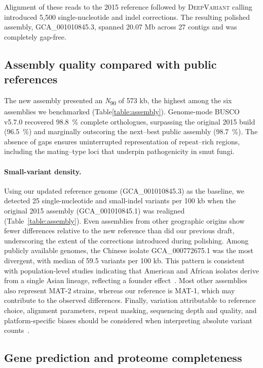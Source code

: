 \documentclass[Journal,letterpaper]{theme}
\begin{document}
Alignment of these reads to the 2015 reference followed by
\textsc{DeepVariant} calling introduced 5,500 single-nucleotide and
indel corrections. The resulting polished assembly, GCA\_001010845.3,
spanned 20.07 Mb across 27 contigs and was completely gap-free.

\subsection*{Assembly quality compared with public references}

The new assembly presented an \textit{N}\textsubscript{90} of 573 kb,
the highest among the six assemblies we benchmarked
(Table\ref{table:assembly}). Genome-mode BUSCO v5.7.0 recovered
98.8~\% complete orthologues, surpassing the
original 2015 build (96.5~\%) and marginally outscoring the
next--best public assembly (98.7~\%). The absence of gaps ensures
uninterrupted representation of repeat--rich regions, including the
mating--type loci that underpin pathogenicity in smut fungi.

\paragraph{Small-variant density.}
Using our updated reference genome (GCA\_001010845.3) as the
baseline, we detected 25 single-nucleotide and small-indel variants
per 100 kb when the original 2015
assembly (GCA\_001010845.1) was realigned (Table~\ref{table:assembly}). Even
assemblies from other geographic origins show fewer differences relative to the
new reference than did our previous draft, underscoring the extent of the
corrections introduced during polishing.  Among publicly available genomes, the
Chinese isolate GCA\_000772675.1 was the most divergent, with median
of 59.5 variants per
100 kb. This pattern is consistent with population-level studies indicating
that American and African isolates derive from a single Asian lineage,
reflecting a founder effect~\cite{RABOIN200764}. Most other assemblies also
represent MAT-2 strains, whereas our reference is MAT-1, which may contribute
to the observed differences. Finally, variation attributable to reference
choice, alignment parameters, repeat masking, sequencing depth and quality, and
platform-specific biases should be considered when interpreting absolute
variant counts~\cite{https://doi.org/10.1002/humu.24311}.

\subsection*{Gene prediction and proteome completeness}
\end{document}
